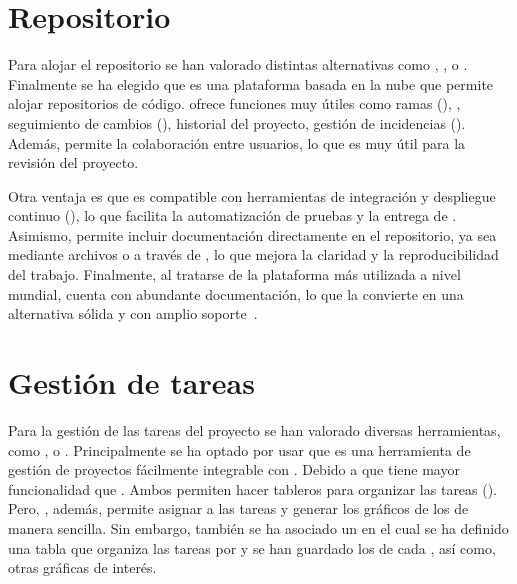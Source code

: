 \section{Repositorio}
Para alojar el repositorio se han valorado distintas alternativas como , ,  o . Finalmente se ha elegido  que es una plataforma basada en la nube que permite alojar repositorios de código.  ofrece funciones muy útiles como ramas (), , seguimiento de cambios (), historial del proyecto, gestión de incidencias (). Además, permite la colaboración entre usuarios, lo que es muy útil para la revisión del proyecto.

Otra ventaja es que  es compatible con herramientas de integración y despliegue continuo (), lo que facilita la automatización de pruebas y la entrega de . Asimismo, permite incluir documentación directamente en el repositorio, ya sea mediante archivos  o a través de , lo que mejora la claridad y la reproducibilidad del trabajo. Finalmente, al tratarse de la plataforma más utilizada a nivel mundial, cuenta con abundante documentación, lo que la convierte en una alternativa sólida y con amplio soporte~\cite{gitHub}.

\section{Gestión de tareas}
Para la gestión de las tareas del proyecto se han valorado diversas herramientas, como ,  o . Principalmente se ha optado por usar  que es una herramienta de gestión de proyectos fácilmente integrable con . Debido a que tiene mayor funcionalidad que . Ambos permiten hacer tableros  para organizar las tareas (). Pero, , además, permite asignar  a las tareas y generar los gráficos  de los  de manera sencilla. Sin embargo, también se ha asociado un  en el cual se ha definido una tabla que organiza las tareas por  y se han guardado los  de cada , así como, otras gráficas de interés.


